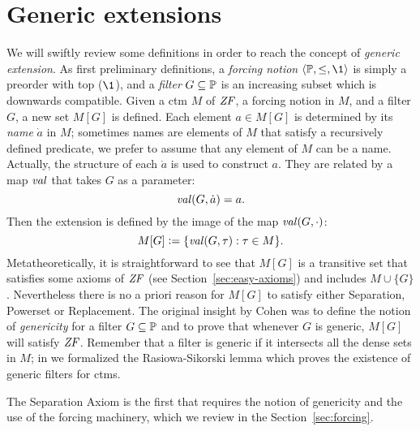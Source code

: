 \section{Generic extensions}
\label{sec:generic-extensions}
We will swiftly review some definitions in order to reach the concept
of \emph{generic extension}. As first preliminary definitions, a
\emph{forcing notion} $\lb\PP,\leq,\1\rb$ is simply a preorder with
top ($\1$), and a \emph{filter} $G\subseteq\mathbb{P}$ is an increasing subset
which is downwards compatible. Given a ctm $M$ of $\mathit{ZF}$, a forcing
notion in $M$, and a filter $G$, a new set $M[G]$ is defined. Each
element $a\in M[G]$ is determined by its \emph{name} $\dot a$ in $M$;
sometimes names are elements of $M$ that satisfy a recursively defined
predicate, we prefer to assume that any element of $M$ can be a
name. Actually, the structure of each $\dot a$ is used to construct
$a$. They are related by a map $\operatorname{\mathit{val}}$ that takes $G$ as a parameter:
\[
\operatorname{\mathit{val}}(G,\dot a) = a.
\] 
Then the extension is defined by the image of the map $\operatorname{\mathit{val}}(G,\cdot)$:
\[
M[G] \mathrel{\mathop:}= \{\operatorname{\mathit{val}}(G,\tau): \tau\in M\}.
\]
Metatheoretically, it is straightforward to see that $M[G]$ is a
transitive set that satisfies some axioms of $\mathit{ZF}$ (see
Section~\ref{sec:easy-axioms}) and includes $M\cup\{G\}$. Nevertheless
there is no a priori reason for $M[G]$ to satisfy either Separation, Powerset
or Replacement. The original insight by Cohen was to define the notion
of \emph{genericity} for a filter $G\subseteq\mathbb{P}$ and to prove that
whenever $G$ is generic, $M[G]$ will satisfy $\mathit{ZF}$. Remember that a
filter is generic if it intersects all the dense sets in $M$; in
\cite{2018arXiv180705174G} we formalized the Rasiowa-Sikorski lemma which
proves the existence of generic filters for ctms.

The Separation Axiom  is the first that requires the notion of
genericity and the use of the forcing machinery, which we review in
the Section~\ref{sec:forcing}.

